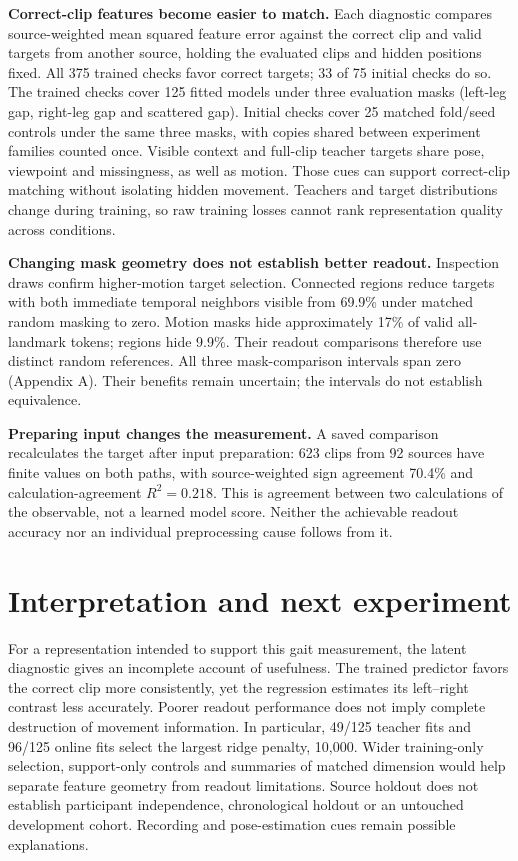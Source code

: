 \documentclass{article}
\begin{document}
\textbf{Correct-clip features become easier to match.} Each diagnostic
compares source-weighted mean squared feature error against the correct
clip and valid targets from another source, holding the evaluated clips
and hidden positions fixed. All 375 trained checks favor correct
targets; 33 of 75 initial checks do so. The trained checks cover 125
fitted models under three evaluation masks (left-leg gap, right-leg gap
and scattered gap). Initial checks cover 25 matched fold/seed controls
under the same three masks, with copies shared between experiment
families counted once. Visible context and full-clip teacher targets
share pose, viewpoint and missingness, as well as motion. Those cues can
support correct-clip matching without isolating hidden movement.
Teachers and target distributions change during training, so raw
training losses cannot rank representation quality across conditions.

\textbf{Changing mask geometry does not establish better readout.}
Inspection draws confirm higher-motion target selection. Connected
regions reduce targets with both immediate temporal neighbors visible
from 69.9\% under matched random masking to zero. Motion masks hide
approximately 17\% of valid all-landmark tokens; regions hide 9.9\%.
Their readout comparisons therefore use distinct random references. All
three mask-comparison intervals span zero (Appendix A). Their benefits
remain uncertain; the intervals do not establish equivalence.

\textbf{Preparing input changes the measurement.} A saved comparison
recalculates the target after input preparation: 623 clips from 92
sources have finite values on both paths, with source-weighted sign
agreement 70.4\% and calculation-agreement \(R^2=0.218\). This is
agreement between two calculations of the observable, not a learned
model score. Neither the achievable readout accuracy nor an individual
preprocessing cause follows from it.

\section{Interpretation and next
experiment}\label{interpretation-and-next-experiment}

For a representation intended to support this gait measurement, the
latent diagnostic gives an incomplete account of usefulness. The trained
predictor favors the correct clip more consistently, yet the regression
estimates its left--right contrast less accurately. Poorer readout
performance does not imply complete destruction of movement information.
In particular, 49/125 teacher fits and 96/125 online fits select the
largest ridge penalty, 10,000. Wider training-only selection,
support-only controls and summaries of matched dimension would help
separate feature geometry from readout limitations. Source holdout does
not establish participant independence, chronological holdout or an
untouched development cohort. Recording and pose-estimation cues remain
possible explanations.
\end{document}
